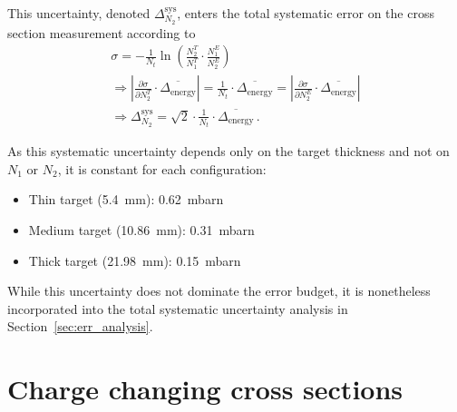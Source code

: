 \begin{appendices}
This uncertainty, denoted $\Delta^{\text{sys}}_{N_2}$, enters the total systematic error on the cross section measurement according to
\begin{gather*}
\sigma = -\frac{1}{N_t} \ln\left(\frac{N_2^T}{N_1^T} \cdot \frac{N_1^E}{N_2^E} \right)\\
\Rightarrow \left|\frac{\partial \sigma}{\partial N_2^T} \cdot \overline{\Delta_{\text{energy}}} \right| = \frac{1}{N_t} \cdot \overline{\Delta_{\text{energy}}} = \left|\frac{\partial \sigma}{\partial N_2^E} \cdot \overline{\Delta_{\text{energy}}} \right|\\
\Rightarrow \Delta^{\text{sys}}_{N_2} = \sqrt{2} \cdot \frac{1}{N_t} \cdot \overline{\Delta_{\text{energy}}} \, .
\end{gather*}

As this systematic uncertainty depends only on the target thickness and not on $N_1$ or $N_2$, it is constant for each configuration:

\begin{itemize}
    \item Thin target (5.4~mm): 0.62~mbarn
    \item Medium target (10.86~mm): 0.31~mbarn
    \item Thick target (21.98~mm): 0.15~mbarn
\end{itemize}

While this uncertainty does not dominate the error budget, it is nonetheless incorporated into the total systematic uncertainty analysis in Section~\ref{sec:err_analysis}.


\clearpage

\section{Charge changing cross sections}


\end{appendices}
